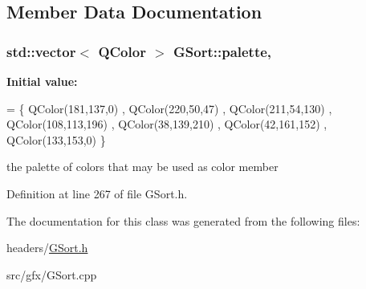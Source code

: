 \subsection{Member Data Documentation}
\hypertarget{classGSort_a5ca0e05b99745151c30e4d44b3c4564d}{
\subsubsection[{palette}]{\setlength{\rightskip}{0pt plus 5cm}std\+::vector$<$ Q\+Color $>$ G\+Sort\+::palette\hspace{0.3cm}{\ttfamily [static]}, {\ttfamily [protected]}}}\label{classGSort_a5ca0e05b99745151c30e4d44b3c4564d}
{\bfseries Initial value\+:}
\begin{DoxyCode}
=   \{   QColor(181,137,0)
                                            ,   QColor(220,50,47)
                                            ,   QColor(211,54,130)
                                            ,   QColor(108,113,196)
                                            ,   QColor(38,139,210)
                                            ,   QColor(42,161,152)
                                            ,   QColor(133,153,0)
                                      \}
\end{DoxyCode}


the palette of colors that may be used as color member 



Definition at line 267 of file G\+Sort.\+h.



The documentation for this class was generated from the following files\+:\begin{DoxyCompactItemize}
\item 
headers/\hyperlink{GSort_8h}{G\+Sort.\+h}\item 
src/gfx/G\+Sort.\+cpp\end{DoxyCompactItemize}
